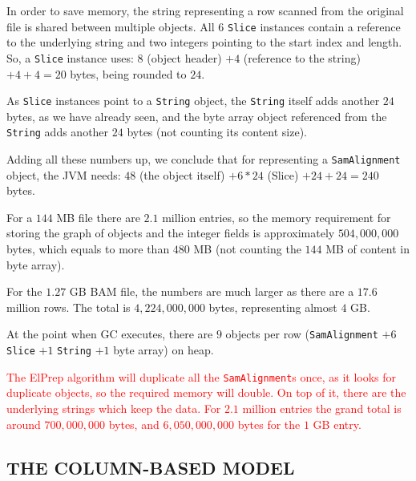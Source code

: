 \documentclass[a4paper,twoside]{article}
\begin{document}
In order to save memory, the string representing a row scanned from the original file is shared between multiple objects. All $6$ {\tt Slice} instances contain a reference to the  underlying string and two integers pointing to the start index and length. So, a {\tt Slice} instance uses: $8$ (object header) $+4$ (reference to the string) $ + 4 + 4 = 20$ bytes, being rounded to $24$.


As {\tt Slice} instances point to a {\tt String} object, the {\tt String} itself adds another $24$ bytes, as we have already seen, and the byte array object referenced from the {\tt String} adds another $24$ bytes (not counting its content size).


Adding all these numbers up, we conclude that for representing a {\tt SamAlignment} object, the JVM needs: $48$ (the object itself) $+ 6*24$ (Slice) $ + 24 + 24 = 240$ bytes.

For a $144$ MB file there are $2.1$ million entries, so the memory requirement for storing the graph of objects and the integer fields is approximately $504,000,000$ bytes, which equals to more than $480$ MB (not counting the $144$ MB of content in byte array).

For the $1.27$ GB BAM file, the numbers are much larger as there are a $17.6$ million rows. The total is $4,224,000,000$ bytes, representing almost $4$ GB.


At the point when GC executes, there are $9$ objects per row 
({\tt SamAlignment} $+ 6$ {\tt Slice} $+ 1$ {\tt String} $+ 1$ byte array) on heap.

\textcolor{red}{
The ElPrep algorithm will duplicate all the {\tt SamAlignment}s once, as it looks for duplicate objects, so the required memory will double. On top of it, there are the underlying strings which keep the data. For $2.1$ million entries the grand total is around $700,000,000$ bytes, and $6,050,000,000$ bytes for the $1$ GB entry.
}



\subsection{\uppercase{The Column-Based Model}}
\end{document}
